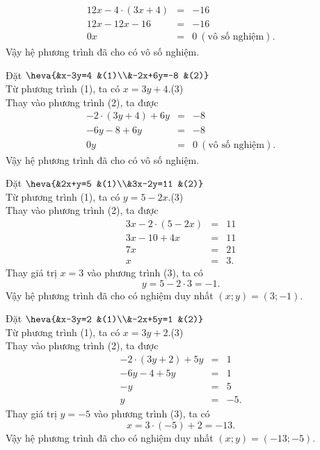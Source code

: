 \begin{vd}
{\begin{listEX}[2]
\begin{eqnarray*}
	12x-4\cdot (3x+4)&=&-16\\
	12x-12x-16&=&-16\\
	0x&=&0\ (\text{vô số nghiệm}).
	\end{eqnarray*}
	Vậy hệ phương trình đã cho có vô số nghiệm.
	\item
	Đặt $\heva{&x-3y=4 &(1)\\&-2x+6y=-8 &(2)}$\\
	Từ phương trình (1), ta có $x=3y+4$.\hfill(3)\\
	Thay vào phương trình (2), ta được
	\allowdisplaybreaks
	\begin{eqnarray*}
	-2\cdot (3y+4)+6y&=&-8\\
	-6y-8+6y&=&-8\\
	0y&=&0\ (\text{vô số nghiệm}).
	\end{eqnarray*}
	Vậy hệ phương trình đã cho có vô số nghiệm.
	\item
	Đặt $\heva{&2x+y=5 &(1)\\&3x-2y=11 &(2)}$\\
	Từ phương trình (1), ta có $y=5-2x$.\hfill(3)\\
	Thay vào phương trình (2), ta được
	\allowdisplaybreaks
	\begin{eqnarray*}
	3x-2\cdot (5-2x)&=&11\\
	3x-10+4x&=&11\\
	7x&=&21\\
	x&=&3.
	\end{eqnarray*}
	Thay giá trị $x=3$ vào phương trình (3), ta có
	\[y=5-2\cdot 3=-1. \]
	Vậy hệ phương trình đã cho có nghiệm duy nhất $(x;y)=(3;-1)$.
	\item
	Đặt $\heva{&x-3y=2 &(1)\\&-2x+5y=1 &(2)}$\\
	Từ phương trình (1), ta có $x=3y+2$.\hfill(3)\\
	Thay vào phương trình (2), ta được
	\allowdisplaybreaks
	\begin{eqnarray*}
	-2\cdot (3y+2)+5y&=&1\\
	-6y-4+5y&=&1\\
	-y&=&5\\
	y&=&-5.
	\end{eqnarray*}
	Thay giá trị $y=-5$ vào phương trình (3), ta có
	\[x=3\cdot (-5)+2=-13. \]
	Vậy hệ phương trình đã cho có nghiệm duy nhất $(x;y)=(-13;-5)$.
	\end{listEX}
	}
\end{vd}
